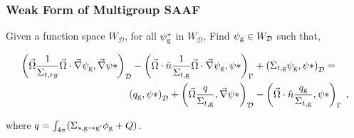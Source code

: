 \subsubsection{Weak Form of Multigroup SAAF}

Given a function space $W_\mathcal{D}$, for all $\psi^*_{\mathrm{g}}$ in $W_\mathcal{D}$, Find $\psi_{\mathrm{g}} \in W_\mathcal{D}$ such that,

\begin{equation}
\begin{split}
        \left ( \vec{\Omega}\frac{1}{\Sigma_{t, rg}}\vec{\Omega}\cdot \vec{\nabla}\psi_{\mathrm{g}}, \vec{\nabla}\psi* \right)_\mathcal{D} -     \left ( \vec{\Omega}\cdot \hat{n} \frac{1}{\Sigma_{t, \mathrm{g}}}\vec{\Omega} \cdot \vec{\nabla} \psi_{\mathrm{g}},\psi* \right )_{\Gamma} &+ \left ( \Sigma_{t, \mathrm{g}} \psi_{\mathrm{g}}, \psi* \right )_\mathcal{D} = \\
        \left ( q_{\mathrm{g}}, \psi* \right)_\mathcal{D} + \left ( \vec{\Omega} \frac{q}{\Sigma_{t, \mathrm{g}}}, \vec{\nabla}\psi* \right)_\mathcal{D} &- \left ( \vec{\Omega}\cdot \hat{n} \frac{q_{\mathrm{g}}}{\Sigma_{t, \mathrm{g}}}, \psi* \right)_{\Gamma} \:,
    \end{split}
\end{equation}

where $q = \int_{4\pi}(\Sigma_{s, \mathrm{g} \rightarrow \mathrm{g}'}\phi_{\mathrm{g}} + Q)$.

